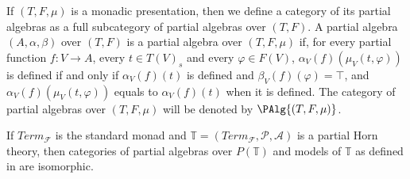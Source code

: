 If $(T,F,\mu)$ is a monadic presentation, then we define a category of its partial algebras as a full subcategory of partial algebras over $(T,F)$.
A partial algebra $(A,\alpha,\beta)$ over $(T,F)$ is a partial algebra over $(T,F,\mu)$ if, for every partial function $f : V \to A$,
    every $t \in T(V)_s$ and every $\varphi \in F(V)$, $\alpha_V(f)(\mu_V(t,\varphi))$ is defined if and only if $\alpha_V(f)(t)$ is defined and $\beta_V(f)(\varphi) = \top$,
    and $\alpha_V(f)(\mu_V(t,\varphi))$ equals to $\alpha_V(f)(t)$ when it is defined.
The category of partial algebras over $(T,F,\mu)$ will be denoted by $\PAlg{(T,F,\mu)}$.

\begin{lem}
If $Term_\mathcal{F}$ is the standard monad and $\mathbb{T} = (Term_\mathcal{F},\mathcal{P},\mathcal{A})$ is a partial Horn theory,
    then categories of partial algebras over $P(\mathbb{T})$ and models of $\mathbb{T}$ as defined in \cite{PHL} are isomorphic.
\end{lem}
